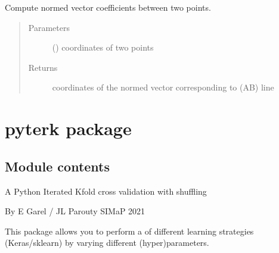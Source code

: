 \documentclass[letterpaper,10pt,english]{sphinxmanual}
\begin{document}
\begin{fulllineitems}
\label{\detokenize{ExperimentsPlannification:modules.vector_coeff}}
\sphinxAtStartPar
Compute normed vector coefficients between two points.
\begin{quote}\begin{description}
\item[{Parameters}] \leavevmode
\sphinxAtStartPar
{} () \textendash{} coordinates of two points

\item[{Returns}] \leavevmode
\sphinxAtStartPar
coordinates of the normed vector corresponding to (AB) line

\end{description}\end{quote}

\end{fulllineitems}



\chapter{pyterk package}
\label{\detokenize{PyTerK:pyterk-package}}\label{\detokenize{PyTerK::doc}}

\section{Module contents}
\label{\detokenize{PyTerK:module-pyterk}}\label{\detokenize{PyTerK:module-contents}}
\sphinxAtStartPar
{} \sphinxhyphen{} A Python Iterated K\sphinxhyphen{}fold cross validation with shuffling

\sphinxAtStartPar
By E Garel / JL Parouty \sphinxhyphen{} SIMaP 2021

\sphinxAtStartPar
This package allows you to perform a  of different learning strategies (Keras/sklearn) by varying different (hyper)parameters.
\end{document}
